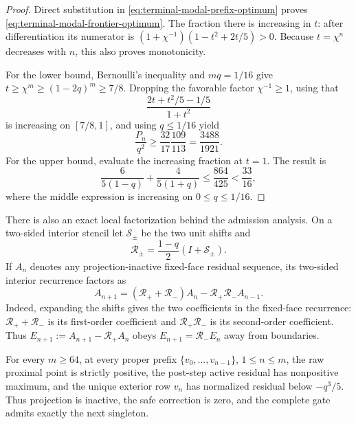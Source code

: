 \begin{proof}
Direct substitution in \eqref{eq:terminal-modal-prefix-optimum} proves
\eqref{eq:terminal-modal-frontier-optimum}.  The fraction there is increasing
in $t$: after differentiation its numerator is
$(1+\chi^{-1})(1-t^2+2t/5)>0$.  Because $t=\chi^n$ decreases with $n$, this
also proves monotonicity.

For the lower bound, Bernoulli's inequality and $mq=1/16$ give
$t\ge\chi^m\ge(1-2q)^m\ge7/8$.  Dropping the favorable factor
$\chi^{-1}\ge1$, using that
\[
 \frac{2t+t^2/5-1/5}{1+t^2}
\]
is increasing on $[7/8,1]$, and using $q\le1/16$ yield
\[
 \frac{P_n}{q^2}
 \ge\frac{32}{17}\frac{109}{113}
 =\frac{3488}{1921}.
\]
For the upper bound, evaluate the increasing fraction at $t=1$.  The result
is
\[
 \frac6{5(1-q)}+\frac4{5(1+q)}
 \le\frac{864}{425}<\frac{33}{16},
\]
where the middle expression is increasing on $0\le q\le1/16$.
\end{proof}

There is also an exact local factorization behind the admission analysis.
On a two-sided interior stencil let $\mathcal S_\pm$ be the two unit shifts
and
\begin{equation}
 \mathcal R_\pm=\frac{1-q}{2}(I+\mathcal S_\pm).
 \label{eq:terminal-modal-directional-operators}
\end{equation}
If $A_n$ denotes any projection-inactive fixed-face residual sequence, its
two-sided interior recurrence factors as
\begin{equation}
 A_{n+1}=(\mathcal R_++\mathcal R_-)A_n
 -\mathcal R_+\mathcal R_-A_{n-1}.
 \label{eq:terminal-modal-directional-factorization}
\end{equation}
Indeed, expanding the shifts gives the two coefficients in the fixed-face
recurrence: $\mathcal R_++\mathcal R_-$ is its first-order coefficient and
$\mathcal R_+\mathcal R_-$ is its second-order coefficient.  Thus
$E_{n+1}:=A_{n+1}-\mathcal R_+A_n$ obeys
$E_{n+1}=\mathcal R_-E_n$ away from boundaries.

\begin{lemma}
\label{lem:terminal-modal-admission-chronology}
For every $m\ge64$, at every proper prefix
$\{v_0,\ldots,v_{n-1}\}$, $1\le n\le m$, the raw proximal point is strictly
positive, the post-step active residual has nonpositive maximum, and the
unique exterior row $v_n$ has normalized residual below $-q^3/5$.  Thus
projection is inactive, the safe correction is zero, and the complete gate
admits exactly the next singleton.
\end{lemma}

